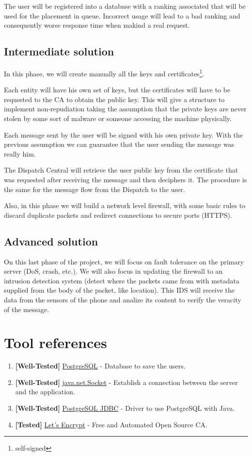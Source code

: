 \documentclass[a4paper,titlepage,11pt]{article}
\begin{document}
The user will be registered into a database with a ranking associated that will be used for the placement in queue.
Incorrect usage will lead to a bad ranking and consequently worse response time when makind a real request.

\subsection{Intermediate solution}
In this phase, we will create manually all the keys and certificates\footnote{self-signed}.

Each entity will have his own set of keys, but the certificates will have to be requested to the CA to obtain the public key.
This will give a structure to implement non-repudiation taking the assumption that the private keys are never stolen
by some sort of malware or someone accessing the machine physically.

Each message sent by the user will be signed with his own private key.
With the previous assumption we can guarantee that the user sending the message was really him.

The Dispatch Central will retrieve the user public key from the certificate that was requested after receiving the message and then deciphers it.
The procedure is the same for the message flow from the Dispatch to the user.

Also, in this phase we will build a network level firewall, with some basic rules to discard duplicate packets and redirect connections to secure ports (HTTPS).

\subsection{Advanced solution}
On this last phase of the project, we will focus on fault tolerance on the primary server (DoS, crash, etc.).
We will also focus in updating the firewall to an intrusion detection system (detect where the packets came from with metadata supplied from the body of the packet, like location). This IDS will receive the data from the sensors of the phone and analize its content to verify the veracity of the message.

\section{Tool references}
\begin{enumerate}
  \item \textbf{[Well-Tested]} \href{https://www.postgresql.org}{PostgreSQL} - Database to save the users.
  \item \textbf{[Well-Tested]} \href{https://docs.oracle.com/javase/7/docs/api/java/net/Socket.html}{java.net.Socket} - Establish a connection between the server and the application.
  \item \textbf{[Well-Tested]} \href{https://jdbc.postgresql.org}{PostgreSQL JDBC} - Driver to use PostgreSQL with Java.
  \item \textbf{[Tested]} \href{https://letsencrypt.org}{Let's Encrypt} - Free and Automated Open Source CA.
\end{enumerate}
\end{document}
